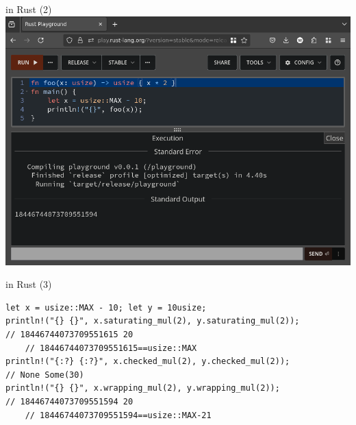 \begin{frame}[fragile]{in Rust (2)}
\includegraphics[height=0.9\textheight]{../overflow-int/rust-oflow-notrap}
\end{frame}

\begin{frame}[fragile]{in Rust (3)}
\begin{Verbatim}[fontsize=\fontsize{11}{12}]
let x = usize::MAX - 10; let y = 10usize;
println!("{} {}", x.saturating_mul(2), y.saturating_mul(2));
// 18446744073709551615 20
    // 18446744073709551615==usize::MAX
println!("{:?} {:?}", x.checked_mul(2), y.checked_mul(2));
// None Some(30)
println!("{} {}", x.wrapping_mul(2), y.wrapping_mul(2));
// 18446744073709551594 20
    // 18446744073709551594==usize::MAX-21
\end{Verbatim}
\end{frame}

